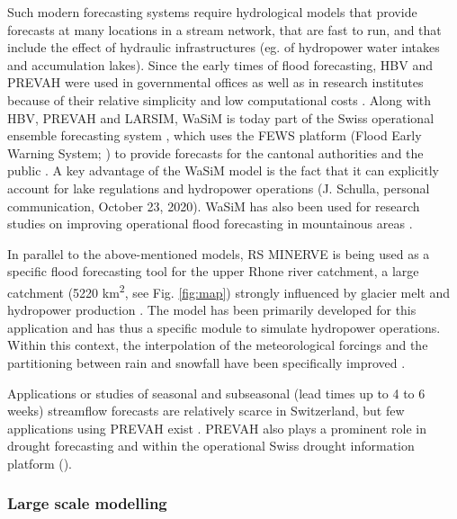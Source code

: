 \documentclass[10pt,a4paper]{article}
\begin{document}
Such modern forecasting systems require hydrological models that provide forecasts at many locations in a stream network, that are fast to run, and that include the effect of hydraulic infrastructures (eg. of hydropower water intakes and accumulation lakes). Since the early times of flood forecasting, HBV and PREVAH were used in governmental offices \citep{Jasper2016} as well as in research institutes because of their relative simplicity and low computational costs \citep{Verbunt2006, Addor2011, Murphy2019, Antonetti2019}. Along with HBV, PREVAH and LARSIM, WaSiM is today part of the Swiss operational ensemble forecasting system \citep{Jasper2016}, which uses the FEWS platform (Flood Early Warning System; \citealp{Werner2013}) to provide forecasts for the cantonal authorities and the public \citep{FOEN2019}. A key advantage of the WaSiM model is the fact that it can explicitly account for lake regulations and hydropower operations (J. Schulla, personal communication, October 23, 2020). WaSiM has also been used for research studies on improving operational flood forecasting in mountainous areas \citep{Jasper2002, Jasper2003, Ahrens2003a, Ahrens2003b}.

In parallel to the above-mentioned models, RS MINERVE is being used as a specific flood forecasting tool for the upper Rhone river catchment, a large catchment (5220 km\textsuperscript{2}, see Fig. \ref{fig:map}) strongly influenced by glacier melt and hydropower production \citep{GarciaHernandez2009b, GarciaHernandez2009, Jordan2010}. The model has been primarily developed for this application and has thus a specific module to simulate hydropower operations. Within this context, the interpolation of the meteorological forcings and the partitioning between rain and snowfall have been specifically improved \citep{Tobin2011, Tobin2012}. 

Applications or studies of seasonal and subseasonal (lead times up to 4 to 6 weeks) streamflow forecasts are relatively scarce in Switzerland, but few applications using PREVAH exist \citep[][]{Monhart2019, Anghileri2019}. PREVAH also plays a prominent role in drought forecasting \citep{Fundel2013, Jorg-Hess2015, Bogner2018b} and within the operational Swiss drought information platform (\citealp{Stahli2013}). 


\subsubsection{Large scale modelling}
\label{sec:application:largescale}
\end{document}
